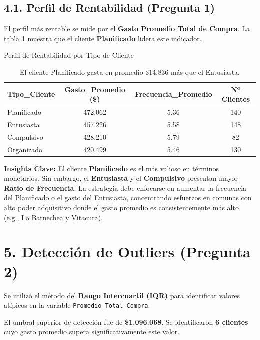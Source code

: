 \documentclass[12pt,a4paper]{article}
\begin{document}
\subsection*{4.1. Perfil de Rentabilidad (Pregunta 1)}
El perfil más rentable se mide por el \textbf{Gasto Promedio Total de Compra}. La tabla \ref{tab:rentabilidad} muestra que el cliente \textbf{Planificado} lidera este indicador.

\begin{table}[H]
    \centering
    \caption{Perfil de Rentabilidad por Tipo de Cliente}
    \label{tab:rentabilidad}
    \begin{tabular}{l c c c}
    \toprule
    \textbf{Tipo\_Cliente} & \textbf{Gasto\_Promedio (\$)} & \textbf{Frecuencia\_Promedio} & \textbf{Nº Clientes} \\
    \midrule
    Planificado & 472.062 & 5.36 & 140 \\
    Entusiasta & 457.226 & 5.58 & 148 \\
    Compulsivo & 428.210 & 5.79 & 82 \\
    Organizado & 420.499 & 5.46 & 130 \\
    \bottomrule
    \end{tabular}
    \caption*{El cliente Planificado gasta en promedio \$14.836 más que el Entusiasta.}
\end{table}

\textbf{Insights Clave:} El cliente \textbf{Planificado} es el más valioso en términos monetarios. Sin embargo, el \textbf{Entusiasta} y el \textbf{Compulsivo} presentan mayor \textbf{Ratio de Frecuencia}. La estrategia debe enfocarse en aumentar la frecuencia del Planificado o el gasto del Entusiasta, concentrando esfuerzos en comunas con alto poder adquisitivo donde el gasto promedio es consistentemente más alto (e.g., Lo Barnechea y Vitacura).

\section*{5. Detección de Outliers (Pregunta 2)}
Se utilizó el método del \textbf{Rango Intercuartil (IQR)} para identificar valores atípicos en la variable \texttt{Promedio\_Total\_Compra}.

El umbral superior de detección fue de \textbf{\$1.096.068}. Se identificaron \textbf{6 clientes} cuyo gasto promedio supera significativamente este valor.
\end{document}
